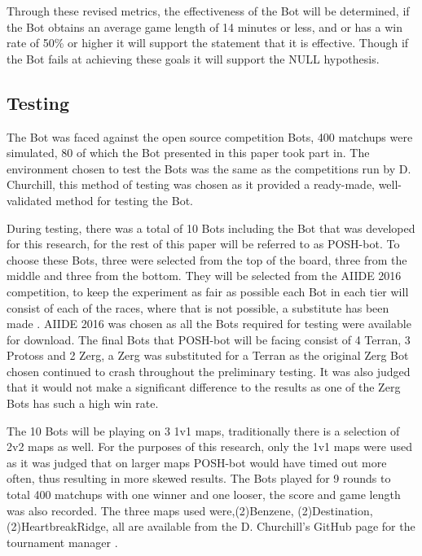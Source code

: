 \documentclass[journal]{IEEEtran}
\begin{document}
	Through these revised metrics, the effectiveness of the Bot will be determined, if the Bot obtains an average game length of 14 minutes or less, and or has a win rate of 50\% or higher it will support the statement that it is effective. Though if the Bot fails at achieving these goals it will support the NULL hypothesis.
	
	\subsection{Testing}
	The Bot was faced against the open source competition Bots, 400 matchups were simulated, 80 of which the Bot presented in this paper took part in. The environment chosen to test the Bots was the same as the competitions run by D. Churchill, this method of testing was chosen as it provided a ready-made, well-validated method for testing the Bot.
	
	During testing, there was a total of 10 Bots including the Bot that was developed for this research, for the rest of this paper will be referred to as POSH-bot. To choose these Bots, three were selected from the top of the board, three from the middle and three from the bottom. They will be selected from the AIIDE 2016 competition, to keep the experiment as fair as possible each Bot in each tier will consist of each of the races, where that is not possible, a substitute has been made \cite{2016}. AIIDE 2016 was chosen as all the Bots required for testing were available for download. The final Bots that POSH-bot will be facing consist of 4 Terran, 3 Protoss and 2 Zerg, a Zerg was substituted for a Terran as the original Zerg Bot chosen continued to crash throughout the preliminary testing. It was also judged that it would not make a significant difference to the results as one of the Zerg Bots has such a high win rate.
	
	The 10 Bots will be playing on 3 1v1 maps, traditionally there is a selection of 2v2 maps as well. For the purposes of this research, only the 1v1 maps were used as it was judged that on larger maps POSH-bot would have timed out more often, thus resulting in more skewed results. The Bots played for 9 rounds to total 400 matchups with one winner and one looser, the score and game length was also recorded. The three maps used were,(2)Benzene, (2)Destination, (2)HeartbreakRidge, all are available from the D. Churchill's GitHub page for the tournament manager \cite{Tournament}. 
	
\end{document}

